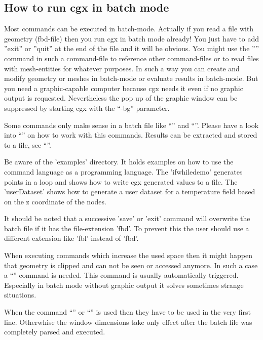 \documentclass{article}
\begin{document}
\begin{appendix}
\subsection{\label{How to run cgx in batch mode}How to run cgx in batch mode}
Most commands can be executed in batch-mode. Actually if you read a file with geometry (fbd-file) then you run cgx in batch mode already! You just have to add ''exit'' or ''quit'' at the end of the file and it will be obvious. You might use the '''' command in such a command-file to reference other command-files or to read files with mesh-entities for whatever purposes. In such a way you can create and modify geometry or meshes in batch-mode or evaluate results in batch-mode. But you need a graphic-capable computer because cgx needs it even if no graphic output is requested. Nevertheless the pop up of the graphic window can be suppressed by starting cgx with the ``-bg'' parameter.

Some commands only make sense in a batch file like ``'' and ``''. Please have a look into ``'' on how to work with this commands. Results can be extracted and stored to a file, see ``''.

Be aware of the 'examples' directory. It holds examples on how to use the command language as a programming language. The 'ifwhiledemo' generates points in a loop and shows how to write cgx generated values to a file. The 'userDataset' shows how to generate a user dataset for a temperature field based on the z coordinate of the nodes.

It should be noted that a successive 'save' or 'exit' command will overwrite the batch file if it has the file-extension 'fbd'. To prevent this the user should use a different extension like 'fbl' instead of 'fbd'.

When executing commands which increase the used space then it might happen that geometry is clipped and can not be seen or accessed anymore. In such a case a ``'' command is needed. This command is usually automatically triggered. Especially in batch mode without graphic output it solves sometimes strange situations.

When the command ``'' or ``'' is used then they have to be used in the very first line. Otherwhise the window dimensions take only effect after the batch file was completely parsed and executed.


\end{appendix}
\end{document}
